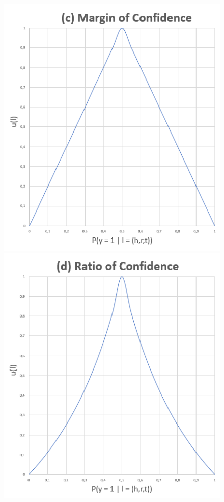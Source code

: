 \begin{figure}
\begin{minipage}{.5\textwidth}
    \end{minipage}
    \begin{minipage}{.5\textwidth}
      \centering
      \includegraphics[width=\linewidth]{figures/smallest_margin_graph.PNG}
    \end{minipage}%
    \begin{minipage}{.5\textwidth}
      \centering
      \includegraphics[width=\linewidth]{figures/smallest_ratio.PNG}

\end{minipage}
\end{figure}
